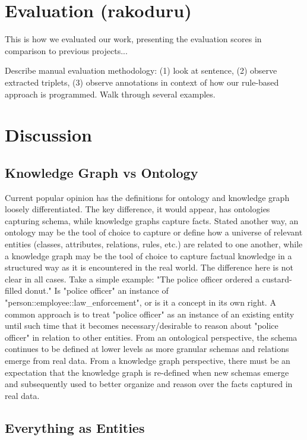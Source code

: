 \documentclass[11pt,letterpaper]{article}
\begin{document}
\section{Evaluation (rakoduru)}

This is how we evaluated our work, presenting the evaluation scores in comparison to previous projects...

Describe manual evaluation methodology: (1) look at sentence, (2) observe extracted triplets, (3) observe annotations in context of how our rule-based approach is programmed.  Walk through several examples.



\section{Discussion}

\subsection{Knowledge Graph vs Ontology}\label{ont_vs_kg}

Current popular opinion \cite{science_where_2018, schrader_whats_2020} has the definitions for ontology and knowledge graph loosely differentiated.  The key difference, it would appear, has ontologies capturing schema, while knowledge graphs capture facts.  Stated another way, an ontology may be the tool of choice to capture or define how a universe of relevant entities (classes, attributes, relations, rules, etc.) are related to one another, while a knowledge graph may be the tool of choice to capture factual knowledge in a structured way as it is encountered in the real world.  The difference here is not clear in all cases.  Take a simple example: "The police officer ordered a custard-filled donut."  Is "police officer" an instance of "person::employee::law\_enforcement", or is it a concept in its own right.  A common approach is to treat "police officer" as an instance of an existing entity until such time that it becomes necessary/desirable to reason about "police officer" in relation to other entities.  From an ontological perspective, the schema continues to be defined at lower levels as more granular schemas and relations emerge from real data.  From a knowledge graph perspective, there must be an expectation that the knowledge graph is re-defined when new schemas emerge and subsequently used to better organize and reason over the facts captured in real data.


\subsection{Everything as Entities}
\end{document}

